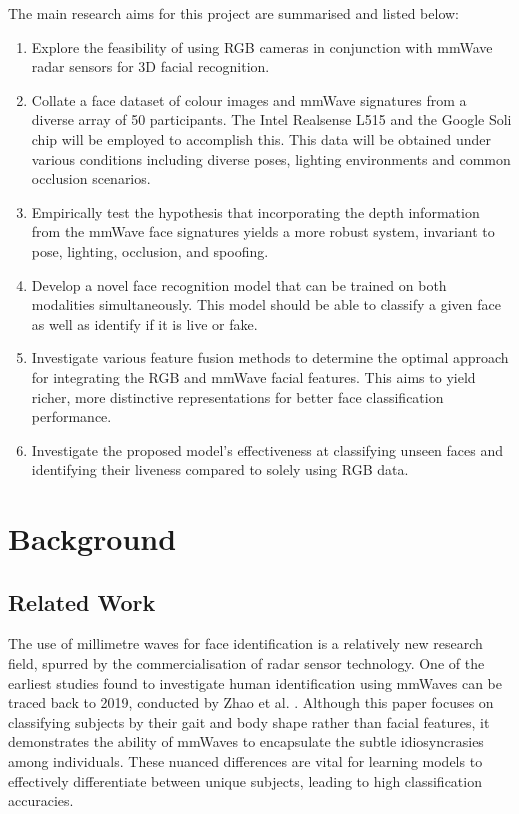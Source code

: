 \documentclass{mpaper}
\begin{document}
The main research aims for this project are summarised and listed below:

\begin{enumerate}
    \item Explore the feasibility of using RGB cameras in conjunction with mmWave radar sensors for 3D facial recognition.
    \item Collate a face dataset of colour images and mmWave signatures from a diverse array of 50 participants. The Intel Realsense L515 \cite{intel-l515} and the Google Soli chip \cite{lien2016soli} will be employed to accomplish this. This data will be obtained under various conditions including diverse poses, lighting environments and common occlusion scenarios.
    \item Empirically test the hypothesis that incorporating the depth information from the mmWave face signatures yields a more robust system, invariant to pose, lighting, occlusion, and spoofing.
    \item Develop a novel face recognition model that can be trained on both modalities simultaneously. This model should be able to classify a given face as well as identify if it is live or fake.
    \item Investigate various feature fusion methods to determine the optimal approach for integrating the RGB and mmWave facial features. This aims to yield richer, more distinctive representations for better face classification performance.
    \item Investigate the proposed model's effectiveness at classifying unseen faces and identifying their liveness compared to solely using RGB data.
\end{enumerate}


\section{Background}

\subsection{Related Work}
The use of millimetre waves for face identification is a relatively new research field, spurred by the commercialisation of radar sensor technology. One of the earliest studies found to investigate human identification using mmWaves can be traced back to 2019, conducted by Zhao et al. \cite{zhao2019mid}. Although this paper focuses on classifying subjects by their gait and body shape rather than facial features, it demonstrates the ability of mmWaves to encapsulate the subtle idiosyncrasies among individuals. These nuanced differences are vital for learning models to effectively differentiate between unique subjects, leading to high classification accuracies.
\end{document}
